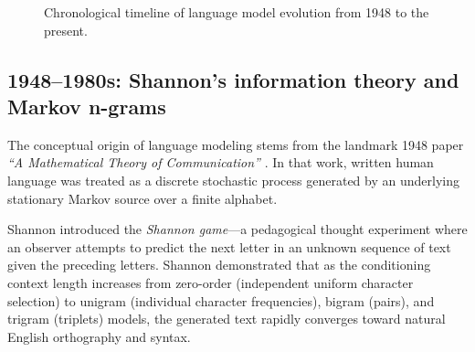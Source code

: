 \documentclass[../../main.tex]{subfiles}
\begin{document}
\begin{figure}[htbp]
\caption{Chronological timeline of language model evolution from 1948 to the present.}
\label{fig:history_timeline}
\end{figure}

\subsection{1948--1980s: Shannon's information theory and Markov n-grams}
\label{subsec:milestone_shannon_markov}

The conceptual origin of language modeling stems from the landmark 1948 paper \textit{``A Mathematical Theory of Communication''} \cite{shannon1948}. In that work, written human language was treated as a discrete stochastic process generated by an underlying stationary Markov source over a finite alphabet. 

Shannon introduced the \emph{Shannon game}---a pedagogical thought experiment where an observer attempts to predict the next letter in an unknown sequence of text given the preceding letters. Shannon demonstrated that as the conditioning context length increases from zero-order (independent uniform character selection) to unigram (individual character frequencies), bigram (pairs), and trigram (triplets) models, the generated text rapidly converges toward natural English orthography and syntax.
\end{document}

